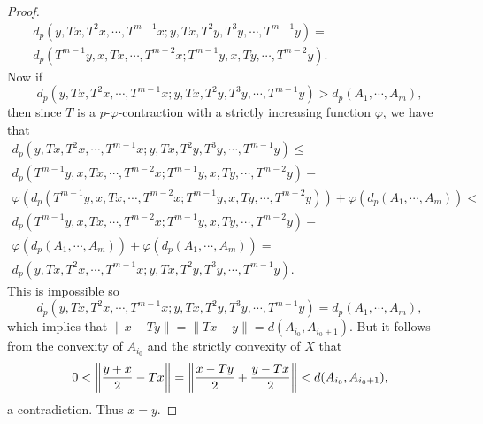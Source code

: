 \documentclass{amsart}
\theoremstyle{definition}
\theoremstyle{remark}
\begin{document}
\begin{proof}
\begin{eqnarray*}
d_p(y,Tx,T^2x,\cdots,T^{m-1}x;y,Tx,T^2y,T^3y,\cdots,T^{m-1}y)=\qquad\qquad\qquad\qquad\\ d_p(T^{m-1}y,x,Tx,\cdots,T^{m-2}x;T^{m-1}y,x,Ty,\cdots,T^{m-2}y).
\end{eqnarray*}
Now if $$d_p(y,Tx,T^2x,\cdots,T^{m-1}x;y,Tx,T^2y,T^3y,\cdots,T^{m-1}y)>d_p(A_1,\cdots,A_m),$$ then since $T$ is a $p$-$\varphi$-contraction with a strictly increasing function $\varphi$, we have that
\begin{eqnarray*}
d_p(y,Tx,T^2x,\cdots,T^{m-1}x;y,Tx,T^2y,T^3y,\cdots,T^{m-1}y)\leq\qquad\qquad\qquad\qquad\\ d_p(T^{m-1}y,x,Tx,\cdots,T^{m-2}x;T^{m-1}y,x,Ty,\cdots,T^{m-2}y)-\qquad\qquad\\\varphi(d_p(T^{m-1}y,x,Tx,\cdots,T^{m-2}x;T^{m-1}y,x,Ty,\cdots,T^{m-2}y))+\varphi(d_p(A_1,\cdots,A_m))<\\ d_p(T^{m-1}y,x,Tx,\cdots,T^{m-2}x;T^{m-1}y,x,Ty,\cdots,T^{m-2}y)-\qquad\qquad\\\varphi(d_p(A_1,\cdots,A_m))+\varphi(d_p(A_1,\cdots,A_m))=\\d_p(y,Tx,T^2x,\cdots,T^{m-1}x;y,Tx,T^2y,T^3y,\cdots,T^{m-1}y).\qquad\qquad
\end{eqnarray*}This is impossible so $$d_p(y,Tx,T^2x,\cdots,T^{m-1}x;y,Tx,T^2y,T^3y,\cdots,T^{m-1}y)=d_p(A_1,\cdots,A_m),$$ which implies that
$\|x-Ty\|=\|Tx-y\|=d(A_{i_0},A_{i_0+1})$. But it follows from the convexity of $A_{i_0}$ and the strictly convexity of $X$ that
$$0<\left\|{{y+x}\over{2}}-Tx\right\|=\left\|{{x-Ty}\over{2}}+{{y-Tx}\over{2}}\right\|<d(A_{i_0},A_{i_0+1}),$$ a contradiction. Thus $x=y$.
\end{proof}
\end{document}
